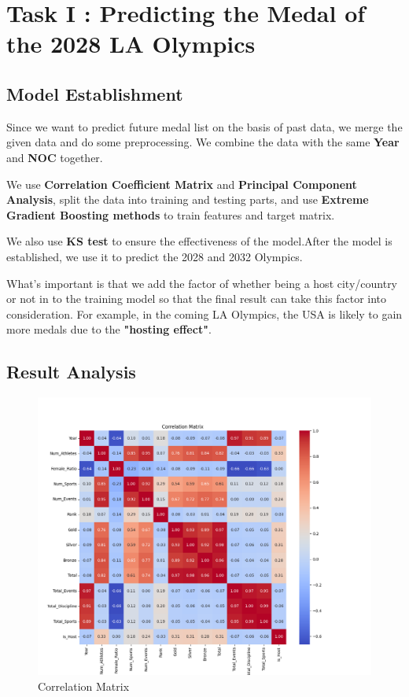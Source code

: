 \section{Task I : Predicting the Medal of the 2028 LA Olympics}
\subsection{Model Establishment}
Since we want to predict future medal list on the basis of past data, we merge the given data and do some preprocessing. 
We combine the data with the same \textbf{Year} and \textbf{NOC} together.

We use \textbf{Correlation Coefficient Matrix} and \textbf{Principal Component Analysis}, split the data
into training and testing parts, and use \textbf{Extreme Gradient Boosting methods} to train features
and target matrix.

We also use \textbf{KS test} to ensure the effectiveness of the model.After the model is established, we use it to predict the 2028 and 2032 Olympics.

What's important is that we add the factor of whether being a host city/country or not in to the training model so that the final result can take this factor into consideration. For example,
in the coming LA Olympics, the USA is likely to gain more medals due to the \textbf{"hosting effect"}.

\subsection{Result Analysis}

\begin{figure}[htbp]
    \centering
    \includegraphics[width=1\textwidth]{./figures/Cor_Matrix.png}
    \caption{Correlation Matrix}
    \label{fig:Cor_Matrix}
\end{figure}

